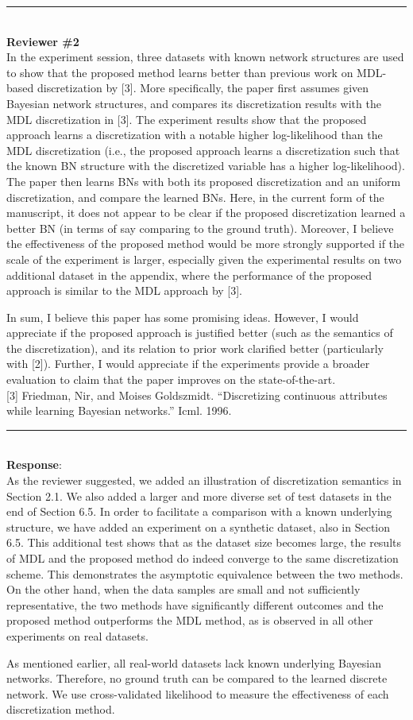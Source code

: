 \documentclass{article}
\begin{document}
\noindent\rule{8cm}{0.4pt}\\
{\bf Reviewer \#2} \\

In the experiment session, three datasets with known network structures are used to show that the proposed method learns better than previous work on MDL-based discretization by [3]. More specifically, the paper first assumes given Bayesian network structures, and compares its discretization results with the MDL discretization in [3]. The experiment results show that the proposed approach learns a discretization with a notable higher log-likelihood than the MDL discretization (i.e., the proposed approach learns a discretization such that the known BN structure with the discretized variable has a higher log-likelihood). The paper then learns BNs with both its proposed discretization and an uniform discretization, and compare the learned BNs. Here, in the current form of the manuscript, it does not appear to be clear if the proposed discretization learned a better BN (in terms of say comparing to the ground truth). Moreover, I believe the effectiveness of the proposed method would be more strongly supported if the scale of the experiment is larger, especially given the experimental results on two additional dataset in the appendix, where the performance of the proposed approach is similar to the MDL approach by [3].

In sum, I believe this paper has some promising ideas. However, I would appreciate if the proposed approach is justified better (such as the semantics of the discretization), and its relation to prior work clarified better (particularly with [2]). Further, I would appreciate if the experiments provide a broader evaluation to claim that the paper improves on the state-of-the-art.\\

[3] Friedman, Nir, and Moises Goldszmidt. ``Discretizing continuous attributes while learning Bayesian networks.'' Icml. 1996.

\noindent\rule{8cm}{0.4pt}\\
{\bf Response}:\\

As the reviewer suggested, we added an illustration of discretization semantics in Section 2.1.
We also added a larger and more diverse set of test datasets in the end of Section 6.5.
In order to facilitate a comparison with a known underlying structure, we have added an experiment on a synthetic dataset, also in Section 6.5.
This additional test shows that as the dataset size becomes large, the results of MDL and the proposed method do indeed converge to the same discretization scheme.
This demonstrates the asymptotic equivalence between the two methods.
On the other hand, when the data samples are small and not sufficiently representative, the two methods have significantly different outcomes and the proposed method outperforms the MDL method, as is observed in all other experiments on real datasets.

As mentioned earlier, all real-world datasets lack known underlying Bayesian networks. Therefore, no ground truth can be compared to the learned discrete network. We use cross-validated likelihood to measure the effectiveness of each discretization method.
\end{document}
